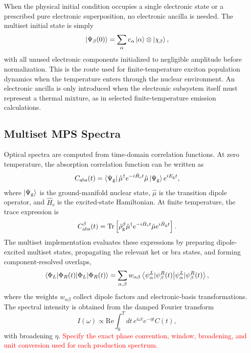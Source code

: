 \documentclass[journal=jctcce,manuscript=article]{achemso}
\newcommand{\placeholder}[1]{\textcolor{red}{#1}}
\begin{document}
When the physical initial condition occupies a single electronic state or a prescribed pure electronic superposition, no electronic ancilla is needed. The multiset initial state is simply
\begin{equation}
    \ket{\Psi_{\beta}(0)} = \sum_{\alpha} c_{\alpha}\ket{\alpha}\otimes\ket{\chi_{\beta}},
    \label{eq:thermal-ms-initial}
\end{equation}
with all unused electronic components initialized to negligible amplitude before normalization. This is the route used for finite-temperature exciton population dynamics when the temperature enters through the nuclear environment. An electronic ancilla is only introduced when the electronic subsystem itself must represent a thermal mixture, as in selected finite-temperature emission calculations.

\subsection{Multiset MPS Spectra}

Optical spectra are computed from time-domain correlation functions. At zero temperature, the absorption correlation function can be written as
\begin{equation}
    C_{\mathrm{abs}}(t)=
    \bra{\Psi_{\mathrm g}}\hat\mu^{\dagger}e^{-i\hat H_{\mathrm e}t}\hat\mu\ket{\Psi_{\mathrm g}}e^{iE_{\mathrm g}t},
    \label{eq:zt-abs}
\end{equation}
where \(\ket{\Psi_{\mathrm g}}\) is the ground-manifold nuclear state, \(\hat\mu\) is the transition dipole operator, and \(\hat H_{\mathrm e}\) is the excited-state Hamiltonian. At finite temperature, the trace expression is
\begin{equation}
    C_{\mathrm{abs}}^{\beta}(t)=
    \Tr\left[\hat\rho_{\mathrm g}^{\beta}\hat\mu^{\dagger}e^{-i\hat H_{\mathrm e}t}\hat\mu e^{i\hat H_{\mathrm g}t}\right].
    \label{eq:ft-abs}
\end{equation}
The multiset implementation evaluates these expressions by preparing dipole-excited multiset states, propagating the relevant ket or bra states, and forming component-resolved overlaps,
\begin{equation}
    \braket{\Phi_L|\Phi_R(t)}=
    \sum_{\alpha,\beta} w_{\alpha\beta}\braket{\psi^L_{\alpha}|\psi^R_{\beta}(t)},
    \label{eq:component-overlap}
\end{equation}
where the weights \(w_{\alpha\beta}\) collect dipole factors and electronic-basis transformations. The spectral intensity is obtained from the damped Fourier transform
\begin{equation}
    I(\omega)\propto\mathrm{Re}\int_0^{T}dt\,e^{i\omega t}e^{-\eta t}C(t),
    \label{eq:fourier-spectrum}
\end{equation}
with broadening \(\eta\). \placeholder{Specify the exact phase convention, window, broadening, and unit conversion used for each production spectrum.}
\end{document}
